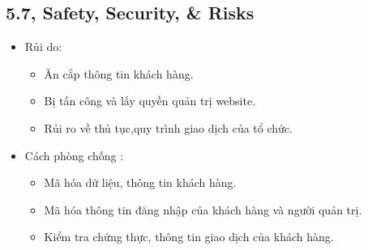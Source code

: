 \documentclass[a4paper,11pt]{report}
\begin{document}
\subsection*{5.7, Safety, Security, \& Risks}
\begin{itemize}
\item Rủi do:
\begin{itemize}
\item Ăn cắp thông tin khách hàng.
\item Bị tấn công và lấy quyền quản trị website.
\item Rủi ro về thủ tục,quy trình giao dịch của tổ chức.
\end{itemize}
\item Cách phòng chống :
\begin{itemize}
\item Mã hóa dữ liệu, thông tin khách hàng.
\item Mã hóa thông tin đăng nhập của khách hàng và người quản trị.
\item Kiểm tra chứng thực, thông tin giao dịch của khách hàng.
\end{itemize}
\end{itemize}
\end{document}
